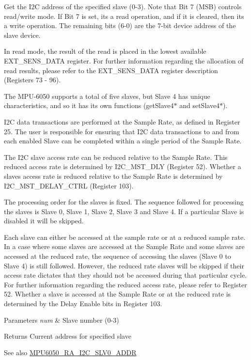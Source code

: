 Get the I2C address of the specified slave (0-\/3). Note that Bit 7 (M\+SB) controls read/write mode. If Bit 7 is set, it\textquotesingle{}s a read operation, and if it is cleared, then it\textquotesingle{}s a write operation. The remaining bits (6-\/0) are the 7-\/bit device address of the slave device.

In read mode, the result of the read is placed in the lowest available E\+X\+T\+\_\+\+S\+E\+N\+S\+\_\+\+D\+A\+TA register. For further information regarding the allocation of read results, please refer to the E\+X\+T\+\_\+\+S\+E\+N\+S\+\_\+\+D\+A\+TA register description (Registers 73 -\/ 96).

The M\+P\+U-\/6050 supports a total of five slaves, but Slave 4 has unique characteristics, and so it has its own functions (get\+Slave4$\ast$ and set\+Slave4$\ast$).

I2C data transactions are performed at the Sample Rate, as defined in Register 25. The user is responsible for ensuring that I2C data transactions to and from each enabled Slave can be completed within a single period of the Sample Rate.

The I2C slave access rate can be reduced relative to the Sample Rate. This reduced access rate is determined by I2\+C\+\_\+\+M\+S\+T\+\_\+\+D\+LY (Register 52). Whether a slave\textquotesingle{}s access rate is reduced relative to the Sample Rate is determined by I2\+C\+\_\+\+M\+S\+T\+\_\+\+D\+E\+L\+A\+Y\+\_\+\+C\+T\+RL (Register 103).

The processing order for the slaves is fixed. The sequence followed for processing the slaves is Slave 0, Slave 1, Slave 2, Slave 3 and Slave 4. If a particular Slave is disabled it will be skipped.

Each slave can either be accessed at the sample rate or at a reduced sample rate. In a case where some slaves are accessed at the Sample Rate and some slaves are accessed at the reduced rate, the sequence of accessing the slaves (Slave 0 to Slave 4) is still followed. However, the reduced rate slaves will be skipped if their access rate dictates that they should not be accessed during that particular cycle. For further information regarding the reduced access rate, please refer to Register 52. Whether a slave is accessed at the Sample Rate or at the reduced rate is determined by the Delay Enable bits in Register 103.


\begin{DoxyParams}{Parameters}
{\em num} & Slave number (0-\/3) \\
\hline
\end{DoxyParams}
\begin{DoxyReturn}{Returns}
Current address for specified slave 
\end{DoxyReturn}
\begin{DoxySeeAlso}{See also}
\mbox{\hyperlink{MPU6050_8h_a423463fce914683217f05e3ca686364c}{M\+P\+U6050\+\_\+\+R\+A\+\_\+\+I2\+C\+\_\+\+S\+L\+V0\+\_\+\+A\+D\+DR}} 
\end{DoxySeeAlso}


